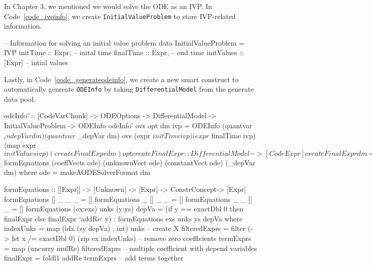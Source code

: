 In Chapter 3, we mentioned we would solve the ODE as an IVP. In Code~\ref{code_ivpinfo}, we create \verb|InitialValueProblem| to store IVP-related information.
\begin{listing}[ht]
\begin{haskell1}
-- Information for solving an initial value problem
data InitialValueProblem = IVP{
  initTime :: Expr, -- inital time
  finalTime :: Expr, -- end time
  initValues :: [Expr] -- intial values
}
\end{haskell1}
\label{code_ivpinfo}
\end{listing}

Lastly, in Code~\ref{code_generateodeinfo}, we create a new smart construct to automatically genreate \verb|ODEInfo| by taking \verb|DifferentialModel| from the generate data pool.
\begin{listing}[ht]
\begin{haskell1}
odeInfo' :: [CodeVarChunk] -> ODEOptions -> DifferentialModel -> InitialValueProblem -> ODEInfo
odeInfo' ovs opt dm ivp = ODEInfo 
  (quantvar $ _indepVar dm) 
  (quantvar $ _depVar dm) 
  ovs 
  (expr $ initTime ivp)
  (expr $ finalTime ivp)
  (map expr $ initValues ivp)
  (createFinalExpr dm)
  opt

createFinalExpr :: DifferentialModel -> [CodeExpr]
createFinalExpr dm = map expr $ formEquations (coeffVects ode) (unknownVect ode) (constantVect ode) (_depVar dm)
  where ode = makeAODESolverFormat dm

formEquations :: [[Expr]] -> [Unknown] -> [Expr] -> ConstrConcept-> [Expr]
formEquations [] _ _ _ = []
formEquations _ [] _ _ = []
formEquations _ _ [] _ = []
formEquations (ex:exs) unks (y:ys) depVa =
  (if y == exactDbl 0 then finalExpr else finalExpr `addRe` y) : formEquations exs unks ys depVa
  where indexUnks = map (idx (sy depVa) . int) unks -- create X
        filteredExprs = filter (\x -> fst x /= exactDbl 0) (zip ex indexUnks) -- remove zero coefficients
        termExprs = map (uncurry mulRe) filteredExprs -- multiple coefficient with depend variables
        finalExpr = foldl1 addRe termExprs -- add terms together
\end{haskell1}
\label{code_generateodeinfo}
\end{listing}
